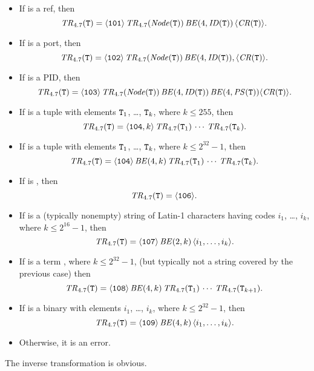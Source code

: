 \begin{itemize}
\item If  is a ref, then
\[{\it TR}_{4.7}({\tt{\sl T}}) = \langle{\tt101}\rangle\,{\it TR}_{4.7}({\it Node}({\tt{\sl T}}))\,
{\it BE}(4,{\it ID}({\tt{\sl T}}))\,\langle{\it CR}({\tt{\sl T}})\rangle.\]
\item If  is a port, then
\[{\it TR}_{4.7}({\tt{\sl T}}) = \langle{\tt102}\rangle\,{\it TR}_{4.7}({\it Node}({\tt{\sl T}}))\,
{\it BE}(4,{\it ID}({\tt{\sl T}})),\langle{\it CR}({\tt{\sl T}})\rangle.\]
\item If  is a PID, then
\[{\it TR}_{4.7}({\tt{\sl T}}) = \langle{\tt103}\rangle\,{\it TR}_{4.7}({\it Node}({\tt{\sl T}}))\,
{\it BE}(4,{\it ID}({\tt{\sl T}}))\,{\it BE}(4,{\it PS}({\tt{\sl T}}))
\langle{\it CR}({\tt{\sl T}})\rangle.\]
\item If is a tuple with elements $\TZ{T}_1$, \ldots, $\TZ{T}_k$, where $k\leq255$, then
\[{\it TR}_{4.7}({\tt{\sl T}}) = \langle{\tt104},k\rangle\,
{\it TR}_{4.7}({\tt{\sl T}}_1)\,\cdots\,{\it TR}_{4.7}({\tt{\sl T}}_k).\]
\item If  is a tuple with elements $\TZ{T}_1$, \ldots, $\TZ{T}_k$, where $k\leq2^{32}-1$, then
\[{\it TR}_{4.7}({\tt{\sl T}}) = \langle{\tt104}\rangle\,{\it BE}(4,k)\,
{\it TR}_{4.7}({\tt{\sl T}}_1)\,\cdots\,{\it TR}_{4.7}({\tt{\sl T}}_k).\]
\item If  is \T{[]}, then
\[{\it TR}_{4.7}({\tt{\sl T}}) = \langle{\tt106}\rangle.\]
\item If  is a (typically nonempty) string of Latin-1 characters having codes
$i_1$, \ldots, $i_k$, where $k\leq2^{16}-1$, then
\[{\it TR}_{4.7}({\tt{\sl T}}) = \langle{\tt107}\rangle\,{\it BE}(2,k)\,
\langle i_1,\ldots,i_k\rangle.\]
\item If  is a term \T{[$\TZ{T}_1$,\ldots,$\TZ{T}_k$|$\TZ{T}_{k+1}$]}, where
$k\leq2^{32}-1$, (but typically not a string covered by the previous case) then
\[{\it TR}_{4.7}({\tt{\sl T}}) = \langle{\tt108}\rangle\,{\it BE}(4,k)\,
{\it TR}_{4.7}({\tt{\sl T}}_1)\,\cdots\,{\it TR}_{4.7}({\tt{\sl T}}_{k+1}).\]
\item If  is a binary with elements $i_1$, \ldots, $i_k$, where $k\leq2^{32}-1$, then
\[{\it TR}_{4.7}({\tt{\sl T}}) = \langle{\tt109}\rangle\,{\it BE}(4,k)\,
\langle i_1,\ldots,i_k\rangle.\]
\item Otherwise, it is an error.
\end{itemize}

The inverse transformation is obvious.
